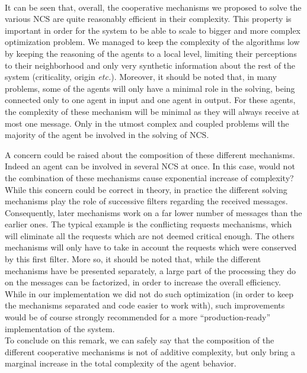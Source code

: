 \paragraph*{}
It can be seen that, overall, the cooperative mechanisms we proposed to solve the various NCS are quite reasonably efficient in their complexity. This property is important in order for the system to be able to scale to bigger and more complex optimization problem. We managed to keep the complexity of the algorithms low by keeping the reasoning of the agents to a local level, limiting their perceptions to their neighborhood and only very synthetic information about the rest of the system (criticality, origin \emph{etc.}). Moreover, it should be noted that, in many problems, some of the agents will only have a minimal role in the solving, being connected only to one agent in input and one agent in output. For these agents, the complexity of these mechanism will be minimal as they will always receive at most one message. Only in the utmost complex and coupled problems will the majority of the agent be involved in the solving of NCS.

A concern could be raised about the composition of these different mechanisms. Indeed an agent can be involved in several NCS at once. In this case, would not the combination of these mechanisms cause exponential increase of complexity? While this concern could be correct in theory, in practice the different solving mechanisms play the role of successive filters regarding the received messages. Consequently, later mechanisms work on a far lower number of messages than the earlier ones. The typical example is the conflicting requests mechanisms, which will eliminate all the requests which are not deemed critical enough. The others mechanisms will only have to take in account the requests which were conserved by this first filter. More so, it should be noted that, while the different mechanisms have be presented separately, a large part of the processing they do on the messages can be factorized, in order to increase the overall efficiency. While in our implementation we did not do such optimization (in order to keep the mechanisms separated and code easier to work with), such improvements would be of course strongly recommended for a more \enquote{production-ready} implementation of the system.\\
To conclude on this remark, we can safely say that the composition of the different cooperative mechanisms is not of additive complexity, but only bring a marginal increase in the total complexity of the agent behavior.

